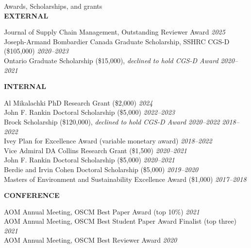 \documentclass{resume} %
\begin{document}
\begin{rSection}{Awards, Scholarships, and grants}
 \ \\
 \MakeUppercase{\bf{External}}
 
Journal of Supply Chain Management, Outstanding Reviewer Award \hfill {\em 2025}\\
Joseph-Armand Bombardier Canada Graduate Scholarship, SSHRC CGS-D (\$105,000) \hfill {\em 2020--2023}\\
Ontario Graduate Scholarship (\$15,000), {\em declined to hold CGS-D Award} 	\hfill {\em 2020--2021}

 \MakeUppercase{\bf{Internal}}
 
Al Mikalachki PhD Research Grant (\$2,000) \hfill {\em2024}\\
John F. Rankin Doctoral Scholarship (\$5,000)	\hfill {\em 2022--2023}\\
Brock Scholarship (\$120,000), {\em declined to hold CGS-D Award 2020--2022} 	\hfill {\em 2018--2022}\\
Ivey Plan for Excellence Award (variable monetary award)	\hfill {\em 2018--2022}\\
Vice Admiral DA Collins Research Grant (\$1,500)	\hfill {\em2020--2021}\\
John F. Rankin Doctoral Scholarship (\$5,000)	\hfill {\em 2020--2021}\\
Berdie and Irvin Cohen Doctoral Scholarship (\$5,000) 	\hfill {\em 2019--2020}\\
Masters of Environment and Sustainability Excellence Award (\$1,000)	\hfill {\em 2017--2018}

 \MakeUppercase{\bf{Conference}}
 
AOM Annual Meeting, OSCM Best Paper Award (top 10\%)	\hfill {\em2021}\\
AOM Annual Meeting, OSCM Best Student Paper Award Finalist (top three)	\hfill {\em2021}\\
AOM Annual Meeting, OSCM Best Reviewer Award \hfill {\em 2020}
\end{rSection}

\end{document}
